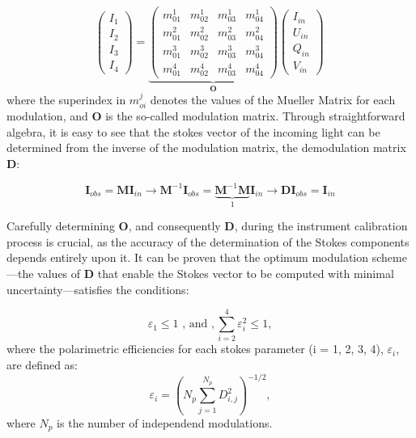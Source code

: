 \begin{equation}
  \begin{pmatrix}
  I _ 1 \\
  I _ 2 \\
  I _ 3 \\
  I _ 4
  \end{pmatrix} = 
  \underbrace{\begin{pmatrix} 
      m ^ 1 _ {01} & m ^ 1 _ {02} & m ^ 1 _ {03} & m ^ 1 _ {04} \\ 
      m ^ 2 _ {01} & m ^ 2 _ {02} & m ^ 2 _ {03} & m ^ 2 _ {04} \\
      m ^ 3 _ {01} & m ^ 3 _ {02} & m ^ 3 _ {03} & m ^ 3 _ {04} \\
      m ^ 4 _ {01} & m ^ 4 _ {02} & m ^ 4 _ {03} & m ^ 4 _ {04} 
  \end{pmatrix}}_ {\textbf{O}}
  \begin{pmatrix}
    I _ {in} \\
    U _ {in} \\
    Q _ {in} \\
    V _ {in}
    \end{pmatrix} \, 
    \label{eq_spectro_theory: stokes_linear_comb}
\end{equation}
where the superindex in $m ^j _{oi}$ denotes the values of the Mueller Matrix for each modulation, and $\textbf{O}$ is the so-called modulation matrix. Through straightforward algebra, it is easy to see that the stokes vector of the incoming light can be determined from the inverse of the modulation matrix, the demodulation matrix $\textbf{D}$: 

\begin{equation}
  \textbf{I}_{obs} = \textbf{M}\textbf{I}_{in}\longrightarrow \textbf{M} ^{-1} \textbf{I}_{obs} = \underbrace{ \textbf{M} ^{-1}\textbf{M}}_{\mathcal{1}}\textbf{I}_{in} \longrightarrow \textbf{D} \textbf{I}_{obs} = \textbf{I}_{in}
\end{equation}

Carefully determining $\textbf{O}$, and consequently $\textbf{D}$, during the instrument calibration process is crucial, as the accuracy of the determination of the Stokes components depends entirely upon it. It can be proven \citep{optimum_modulation} that the optimum modulation scheme—the values of $\textbf{D}$ that enable the Stokes vector to be computed with minimal uncertainty—satisfies the conditions:

\begin{equation}
  \varepsilon _ 1 \leqslant 1 \text{     , and     }, \sum _ {i = 2} ^4 \varepsilon _ i ^2 \leqslant 1,
  \label{eq_intro:optimum_efficiencies}
\end{equation}
where the polarimetric efficiencies for each stokes parameter (i = 1, 2, 3, 4), $\varepsilon _ i$, are defined as:
\begin{equation}
  \varepsilon _ i = \left( N_p \sum _ {j = 1} ^ {N_p} D _ {i, j} ^2\right) ^{-1/2},
  \label{eq_intro: polarimetric_efficiencies_definition}
\end{equation}
where $N_p$ is the number of independend modulations. 

